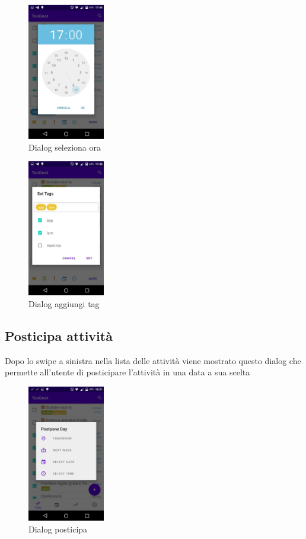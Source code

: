 \documentclass[]{article}
\begin{document}
\begin{figure}
\centering
\includegraphics[width=0.3\textwidth,height=0.1\textheight]{./img/dialog_picker.jpg}
\caption{Dialog seleziona ora}
\end{figure}

\begin{figure}
\centering
\includegraphics[width=0.3\textwidth,height=0.1\textheight]{./img/dialog_task.jpg}
\caption{Dialog aggiungi tag}
\end{figure}

\hypertarget{posticipa-attivitaux300}{%
\subsection{Posticipa attività}\label{posticipa-attivitaux300}}

Dopo lo swipe a sinistra nella lista delle attività viene mostrato
questo dialog che permette all'utente di posticipare l'attività in una
data a sua scelta

\begin{figure}
\centering
\includegraphics[width=0.3\textwidth,height=0.1\textheight]{./img/postpone_dialog.jpg}
\caption{Dialog posticipa}
\end{figure}
\end{document}
